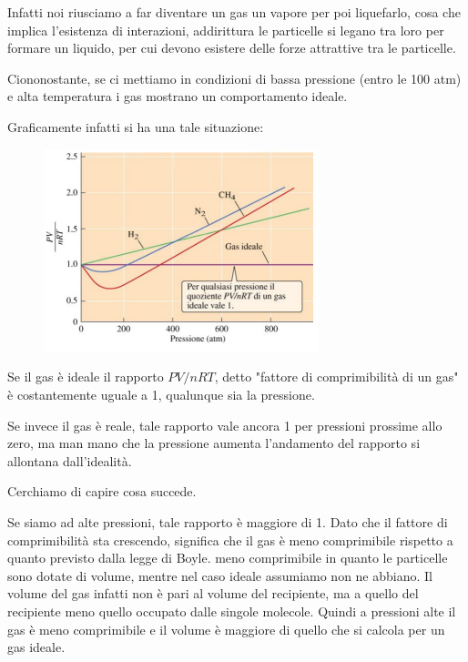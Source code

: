Infatti noi riusciamo a far diventare un gas un vapore per poi liquefarlo, cosa che implica l'esistenza di interazioni, addirittura le particelle si legano tra loro per formare un liquido, per cui devono esistere delle forze attrattive tra le particelle.

Ciononostante, se ci mettiamo in condizioni di bassa pressione (entro le 100 atm) e alta temperatura i gas mostrano un comportamento ideale.

Graficamente infatti si ha una tale situazione:

\begin{minipage}{0.55 \textwidth}
    \begin{figure}[H]
        \includegraphics[width=8cm]{immagini/grafico_gas_reali.png}
    \end{figure}
\end{minipage}
\begin{minipage}{0.44 \textwidth}
\vspace{-0.4cm}Se il gas è ideale il rapporto $PV/nRT$, detto "fattore di comprimibilità di un gas" è costantemente uguale a 1, qualunque sia la pressione. 

\vspace{0.2cm}Se invece il gas è reale, tale rapporto vale ancora 1 per pressioni prossime allo zero, ma man mano che la pressione aumenta l'andamento del rapporto si allontana dall'idealità.
\end{minipage}

Cerchiamo di capire cosa succede.

Se siamo ad alte pressioni, tale rapporto è maggiore di 1. Dato che il fattore di comprimibilità sta crescendo, significa che il gas è meno comprimibile rispetto a quanto previsto dalla legge di Boyle. \E meno comprimibile in quanto le particelle sono dotate di volume, mentre nel caso ideale assumiamo non ne abbiano. Il volume del gas infatti non è pari al volume del recipiente, ma a quello del recipiente meno quello occupato dalle singole molecole. Quindi a pressioni alte il gas è meno comprimibile e il volume è maggiore di quello che si calcola per un gas ideale.

